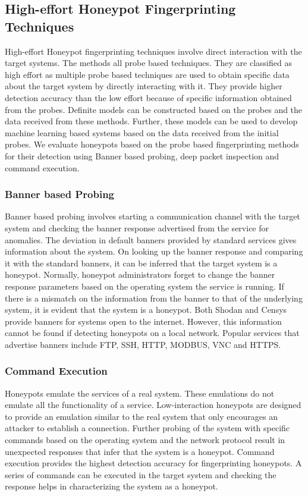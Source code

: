 \documentclass[../main.tex]{subfiles}
\begin{document}
\subsection{High-effort Honeypot Fingerprinting Techniques}
High-effort Honeypot fingerprinting techniques involve direct interaction with the target systems. The methods all probe based techniques. They are classified as high effort as multiple probe based techniques are used to obtain specific data about the target system by directly interacting with it. They provide higher detection accuracy than the low effort because of specific information obtained from the probes. Definite models can be constructed based on the probes and the data received from these methods. Further, these models can be used to develop machine learning based systems based on the data received from the initial probes. We evaluate honeypots based on the probe based fingerprinting methods for their detection using Banner based probing, deep packet inspection and command execution.

\subsubsection{Banner based Probing}
Banner based probing involves starting a communication channel with the target system and checking the banner response advertised from the service for anomalies. The deviation in default banners provided by standard services gives information about the system. On looking up the banner response and comparing it with the standard banners, it can be inferred that the target system is a honeypot. Normally, honeypot administrators forget to change the banner response parameters based on the operating system the service is running. If there is a mismatch on the information from the banner to that of the underlying system, it is evident that the system is a honeypot. Both Shodan and Censys provide banners for systems open to the internet. However, this information cannot be found if detecting honeypots on a local network. Popular services that advertise banners include FTP, SSH, HTTP, MODBUS, VNC and HTTPS. 


\subsubsection{Command Execution}
Honeypots emulate the services of a real system. These emulations do not emulate all the functionality of a service. Low-interaction honeypots are designed to provide an emulation similar to the real system that only encourages an attacker to establish a connection. Further probing of the system with specific commands based on the operating system and the network protocol result in unexpected responses that infer that the system is a honeypot. Command execution provides the highest detection accuracy for fingerprinting honeypots. A series of commands can be executed in the target system and checking the response helps in characterizing the system as a honeypot. 
\end{document}
